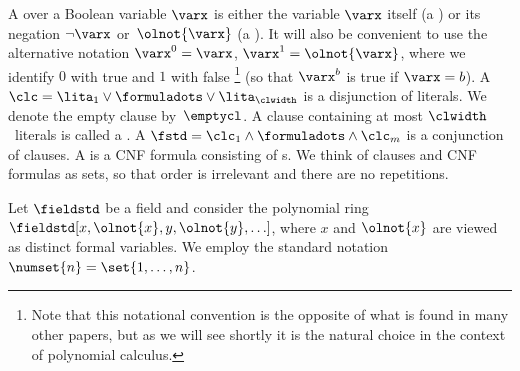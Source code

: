 \documentclass[11pt]{article}
\numberwithin{equation}{section}
\theoremstyle{definition}
\theoremstyle{plain}
\begin{document}
A  over a Boolean variable $\varx$ is either
the variable 
$\varx$ itself (a 
)
or its negation $\lnot \varx$ or~$\olnot{\varx}$ (a
). It will also be convenient to use
the alternative notation $\varx^0=\varx$, $\varx^1=\olnot{\varx}$,
where we identify $0$ with true and $1$ with false%
\footnote{Note that 
this notational convention is 
the opposite of what is found in many other papers, but as we will see
shortly it is the natural choice in the  context of polynomial
calculus.} 
(so that $\varx^b$ is true if $\varx = b$).
%
A  $\clc = \lita_1 \lor \formuladots \lor
\lita_{\clwidth}$ is a disjunction of literals. We denote the empty
clause by~$\emptycl$.  A clause containing at most $\clwidth$~literals
is called a . A
 $\fstd = \clc_1 \land \formuladots \land
\clc_m$ is a conjunction of clauses. A \introduceterm{\kcnfform{}} is
a CNF formula consisting of \xclause{\clwidth}{}s.
We think of clauses and CNF formulas as sets, %
so that order is irrelevant  and there %
are   %
no repetitions.

Let $\fieldstd$ be a 
%
field and consider the polynomial ring
$\fieldstd[x, \olnot{x}, y, \olnot{y}, \ldots]$,
%
where 
$x$
and
$\olnot{x}$
are viewed
as distinct formal 
variables. 
%
We employ the standard notation $\numset{n} =
\set{1,\ldots,n}$.
\end{document}

